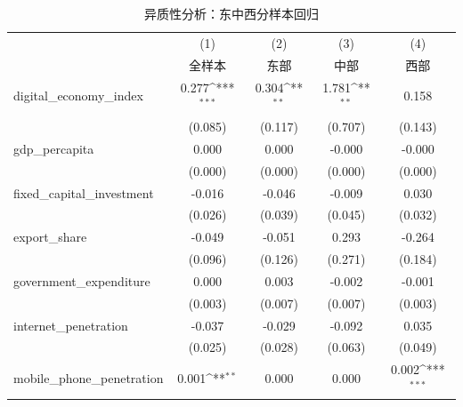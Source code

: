 \begin{table}[htbp]\centering
\def\sym#1{\ifmmode^{#1}\else\(^{#1}\)\fi}
\caption{异质性分析：东中西分样本回归\label{tab:heterogeneity}}
\begin{tabular}{l*{4}{c}}
\toprule
                    &\multicolumn{1}{c}{(1)}&\multicolumn{1}{c}{(2)}&\multicolumn{1}{c}{(3)}&\multicolumn{1}{c}{(4)}\\
                    &\multicolumn{1}{c}{全样本}&\multicolumn{1}{c}{东部}&\multicolumn{1}{c}{中部}&\multicolumn{1}{c}{西部}\\
\midrule
digital\_economy\_index&       0.277\sym{***}&       0.304\sym{**} &       1.781\sym{**} &       0.158         \\
                    &     (0.085)         &     (0.117)         &     (0.707)         &     (0.143)         \\
\addlinespace
gdp\_percapita       &       0.000         &       0.000         &      -0.000         &      -0.000         \\
                    &     (0.000)         &     (0.000)         &     (0.000)         &     (0.000)         \\
\addlinespace
fixed\_capital\_investment&      -0.016         &      -0.046         &      -0.009         &       0.030         \\
                    &     (0.026)         &     (0.039)         &     (0.045)         &     (0.032)         \\
\addlinespace
export\_share        &      -0.049         &      -0.051         &       0.293         &      -0.264         \\
                    &     (0.096)         &     (0.126)         &     (0.271)         &     (0.184)         \\
\addlinespace
government\_expenditure&       0.000         &       0.003         &      -0.002         &      -0.001         \\
                    &     (0.003)         &     (0.007)         &     (0.007)         &     (0.003)         \\
\addlinespace
internet\_penetration&      -0.037         &      -0.029         &      -0.092         &       0.035         \\
                    &     (0.025)         &     (0.028)         &     (0.063)         &     (0.049)         \\
\addlinespace
mobile\_phone\_penetration&       0.001\sym{**} &       0.000         &       0.000         &       0.002\sym{***}\\

\end{tabular}
\end{table}
